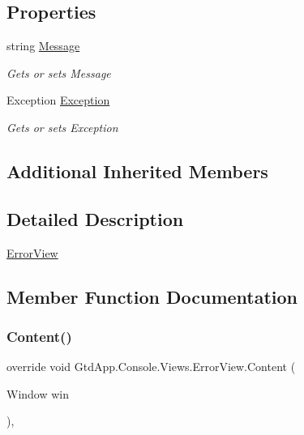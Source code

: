 \subsection*{Properties}
\begin{DoxyCompactItemize}
\item 
string \mbox{\hyperlink{class_gtd_app_1_1_console_1_1_views_1_1_error_view_a85e262bc70f0bdc8d0145ee015b72aef}{Message}}
\begin{DoxyCompactList}\small\item\em Gets or sets Message \end{DoxyCompactList}\item 
Exception \mbox{\hyperlink{class_gtd_app_1_1_console_1_1_views_1_1_error_view_a03723522a97eac75194a662104524f2b}{Exception}}
\begin{DoxyCompactList}\small\item\em Gets or sets Exception \end{DoxyCompactList}\end{DoxyCompactItemize}
\subsection*{Additional Inherited Members}


\subsection{Detailed Description}
\mbox{\hyperlink{class_gtd_app_1_1_console_1_1_views_1_1_error_view}{Error\+View}} 



\subsection{Member Function Documentation}
\mbox{\label{class_gtd_app_1_1_console_1_1_views_1_1_error_view_a0d228bc1e760ed818a207e7399011839}} 
\subsubsection{\texorpdfstring{Content()}{Content()}}
{\footnotesize\ttfamily override void Gtd\+App.\+Console.\+Views.\+Error\+View.\+Content (\begin{DoxyParamCaption}\item[{Window}]{win }\end{DoxyParamCaption})\hspace{0.3cm}{\ttfamily [protected]}, {\ttfamily [virtual]}}




